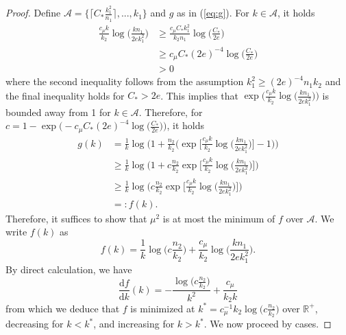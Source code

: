 \documentclass{article}
\newcommand{\D}{\textrm{d}}
\newcommand{\R}{\mathbb{R}}
\newcommand{\cA}{\mathcal{A}}
\newcommand{\Ct}{C_{*}}
\begin{document}
\begin{proof}
    Define $\cA = \{\lceil  \Ct \frac{k_1^2}{n_1}\rceil, ..., k_1 \}$ and $g$ as in (\ref{eq:g}). For $k \in \cA$, it holds 
    \begin{align*}
        \frac{c_\mu k}{k_2}\log\Big(\frac{kn_1}{2ek_1^2}\Big) &\geq \frac{c_\mu \Ct k_1^2}{k_2n_1}\log\Big(\frac{\Ct}{2e}\Big) \\
        &\geq c_\mu \Ct (2e)^{-4}\log \Big(\frac{\Ct}{2e}\Big) \\
        &> 0
    \end{align*}
    where the second inequality follows from the assumption $k_1^2 \geq (2e)^{-4}n_1k_2$ and the final inequality holds for $\Ct > 2e$. This implies that $\exp\Big(\frac{c_\mu k}{k_2}\log\Big(\frac{kn_1}{2ek_1^2}\Big)\Big)$ is bounded away from 1 for $k \in \cA$. Therefore, for $c = 1 - \exp\Big(-c_\mu \Ct (2e)^{-4}\log \Big(\frac{\Ct}{2e}\Big)\Big)$, it holds
    \begin{align*}
        g(k) &= \frac{1}{k}\log\Bigg(1 + \frac{n_2}{k_2}\bigg(\exp\Big[\frac{c_\mu k}{k_2}\log\big(\frac{kn_1}{2ek_1^2}\big)\Big] - 1\bigg)\Bigg)\\
        &\geq \frac{1}{k}\log\Bigg(1 + c\frac{n_2}{k_2}\exp\Big[\frac{c_\mu k}{k_2}\log\big(\frac{kn_1}{2ek_1^2}\big)\Big]\Bigg)\\
        &\geq \frac{1}{k}\log\Bigg(c\frac{n_2}{k_2}\exp\Big[\frac{c_\mu k}{k_2}\log\big(\frac{kn_1}{2ek_1^2}\big)\Big]\Bigg) \\
        &=: f(k).
    \end{align*}
    Therefore, it suffices to show that $\mu^2$ is at most the minimum of $f$ over $\cA$. We write $f(k)$ as 
    \[f(k) = \frac{1}{k}\log\Big(c\frac{n_2}{k_2}\Big) + \frac{c_\mu}{k_2}\log\Big(\frac{kn_1}{2ek_1^2}\Big).\]
    By direct calculation, we have
    \[\frac{\D f}{\D k}(k) = -\frac{\log\big(c\frac{n_2}{k_2}\big)}{k^2} + \frac{c_\mu}{k_2k}\]
    from which we deduce that $f$ is minimized at $k^* = c_\mu^{-1}k_2\log\big(c\frac{n_2}{k_2}\big)$ over $\R^+$, decreasing for $k < k^*$, and increasing for $k > k^*$. We now proceed by cases.


\end{proof}
\end{document}

